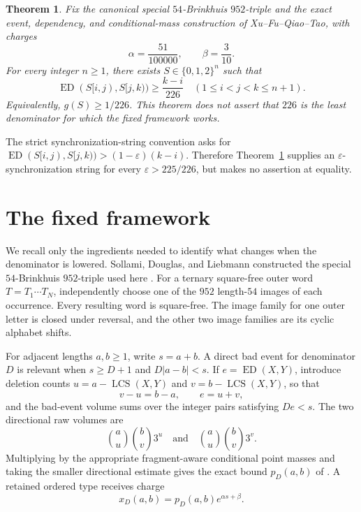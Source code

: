 \documentclass[11pt]{article}
\newtheorem{theorem}{Theorem}
\newcommand{\ED}{\operatorname{ED}}
\newcommand{\LCS}{\operatorname{LCS}}
\begin{document}
\begin{theorem}\label{thm:main}
Fix the canonical special $54$-Brinkhuis $952$-triple and the exact event,
dependency, and conditional-mass construction of Xu--Fu--Qiao--Tao, with
charges
\[
             \alpha=\frac{51}{100000},\qquad \beta=\frac3{10}.
\]
For every integer $n\geq1$, there exists $S\in\{0,1,2\}^n$ such that
\[
 \ED(S[i,j),S[j,k))\geq\frac{k-i}{226}
 \quad(1\leq i<j<k\leq n+1).
\]
Equivalently, $g(S)\geq1/226$.  This theorem does not assert that $226$ is
the least denominator for which the fixed framework works.
\end{theorem}

The strict synchronization-string convention asks for
$\ED(S[i,j),S[j,k))>(1-\varepsilon)(k-i)$.  Therefore
Theorem~\ref{thm:main} supplies an $\varepsilon$-synchronization string for
every $\varepsilon>225/226$, but makes no assertion at equality.

\section{The fixed framework}

We recall only the ingredients needed to identify what changes when the
denominator is lowered.  Sollami, Douglas, and Liebmann constructed the
special $54$-Brinkhuis $952$-triple used here \cite{SollamiEtAl2016}.  For a
ternary square-free outer word $T=T_1\cdots T_N$, independently choose one of
the $952$ length-$54$ images of each occurrence.  Every resulting word is
square-free.  The image family for one outer letter is closed under reversal,
and the other two image families are its cyclic alphabet shifts.

For adjacent lengths $a,b\geq1$, write $s=a+b$.  A direct bad event for
denominator $D$ is relevant when $s\geq D+1$ and
$D|a-b|<s$.  If $e=\ED(X,Y)$, introduce deletion counts
$u=a-\LCS(X,Y)$ and $v=b-\LCS(X,Y)$, so that
\[
 v-u=b-a,\qquad e=u+v,
\]
and the bad-event volume sums over the integer pairs satisfying $De<s$.
The two directional raw volumes are
\[
 \binom au\binom bv3^u
 \quad\text{and}\quad
 \binom au\binom bv3^v.
\]
Multiplying by the appropriate fragment-aware conditional point masses and
taking the smaller directional estimate gives the exact bound $p_D(a,b)$ of
\cite[Appendices D--E]{XuEtAl2026}.  A retained ordered type receives charge
\[
             x_D(a,b)=p_D(a,b)e^{\alpha s+\beta}.
\]
\end{document}
